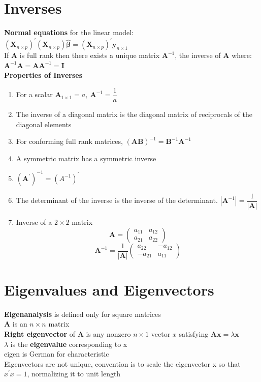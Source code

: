 \documentclass[openany]{book}
\newcommand{\lm}{\lambda}
\newcommand{\hb}{\hat{\beta}}
\newcommand{\bmx}{\bm{X}}
\newcommand{\bma}{\bm{A}}
\numberwithin{equation}{section}
\begin{document}
\begin{flushleft}
\section{Inverses}
\textbf{Normal equations} for the linear model:\\
$(\bmx_{n\times p})^{'}(\bmx_{n \times p})\bm{\hb}=(\bmx_{n\times p})^{'}\bm{y}_{n\times 1}$\\
If $\bma$ is full rank then there exists a unique matrix $\bma^{-1}$, the inverse of $\bma$ where:\\
$\bma^{-1}\bma=\bma\bma^{-1}=\bm{I}$\\
\textbf{Properties of Inverses}\\
\begin{enumerate}
\item For a scalar $\bma_{1\times 1} =a, \ \bma^{-1}=\dfrac{1}{a}$
\item The inverse of a diagonal matrix is the diagonal matrix of reciprocals of the diagonal elements
\item For conforming full rank matrices, $(\bm{AB})^{-1}=\bm{B}^{-1}\bma^{-1}$
\item A symmetric matrix has a symmetric inverse
\item $(\bma^{'})^{-1}=(A^{-1})^{'}$
\item The determinant of the inverse is the inverse of the determinant. $|\bma^{-1}|=\dfrac{1}{|\bma|}$
\item Inverse of a $2\times 2$ matrix
 \[\bma=
\left( \begin{array}{cc}
a_{11}& a_{12}\\
a_{21}&a_{22}
\end{array}\right)
\]
\[\bma^{-1}=\dfrac{1}{|\bma|}\left(\begin{array}{cc}
a_{22}&-a_{12}\\
-a_{21}& a_{11}
\end{array}\right)
\]
\end{enumerate}
\section{Eigenvalues and Eigenvectors}
\textbf{Eigenanalysis} is defined only for square matrices\\
$\bm{A}$ is an $n\times n$ matrix\\
\textbf{Right eigenvector} of $\bma$ is any nonzero $n\times 1$ vector $x$ satisfying $\bm{Ax}=\lambda\bm{x}$\\
$\lm$ is the \textbf{eigenvalue} corresponding to x\\
eigen is German for characteristic\\
Eigenvectors are not unique, convention is to scale the eigenvector x so that $x^{'}x=1$, normalizing it to unit length\\
\pagebreak

\end{flushleft}
\end{document}
